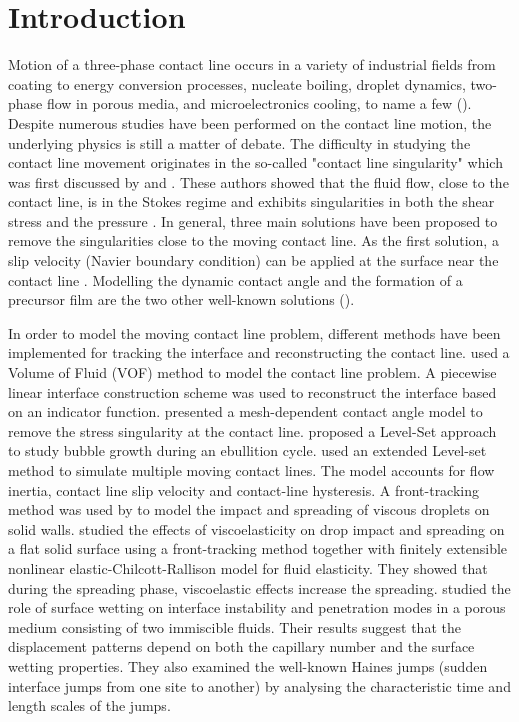 \documentclass[review]{elsarticle}
\begin{document}
\section{Introduction}\label{sec:introduction}
Motion of  a three-phase contact line occurs in a variety of industrial fields from coating to energy conversion processes, nucleate boiling, droplet dynamics, two-phase flow in porous media, and microelectronics cooling, to name a few (\cite{Sui2013b,Sui2013a,Yarin2006}). Despite numerous studies  have been performed on the contact line motion, the underlying physics is still a matter of debate.
 The difficulty  in  studying the contact line movement originates in the so-called "contact line singularity" which was first discussed by \cite{Moffat1964} and 
  \cite{Huh1971}.  These authors showed that the fluid flow, close to the contact line, is in the Stokes regime and exhibits singularities in both the shear stress and the pressure \citep{Krechetnikov2019}. In general, three main solutions have been proposed to remove the singularities close to the moving contact line.  As the first solution, a slip velocity (Navier boundary condition) can be applied at the surface near the contact line \citep{Dussan1979}.  Modelling the dynamic contact angle and   the formation of a precursor film are the two other well-known solutions (\cite{Sui2013b}).

In order to model the moving contact line problem, different methods have been implemented for tracking the interface and reconstructing the contact line. \citep{Renardy2001} used a Volume of Fluid (VOF) method to model the contact line problem. A piecewise linear interface construction scheme was used to reconstruct the interface based on an indicator function.  \cite{AFKHAMI20095370} presented a mesh-dependent contact angle model to remove the stress singularity at the contact line.
\cite{Abhijit2007}  proposed a Level-Set approach to study bubble growth during an ebullition cycle. \cite{SPELT2005389} used an extended Level-set method to simulate multiple moving contact lines. The model accounts for flow inertia, contact line slip velocity and contact-line hysteresis. A front-tracking method was used by \cite{Muradoglu2010} to model the impact and spreading of viscous droplets on solid walls. \cite{PhysRevFluids.1.023302} studied the effects of viscoelasticity on drop impact and spreading on a flat solid surface using a front-tracking method together with finitely extensible nonlinear elastic-Chilcott-Rallison model for fluid elasticity. They showed that during the spreading phase, viscoelastic effects increase the spreading.  \cite{Afkhami} studied the role of surface wetting on interface instability and penetration modes in a porous medium consisting of two immiscible fluids. Their results suggest that the displacement patterns depend on both the capillary number and the surface wetting properties. They also examined the well-known Haines jumps (sudden interface jumps from one site to another) by analysing the characteristic time and length scales of the jumps.
\end{document}
